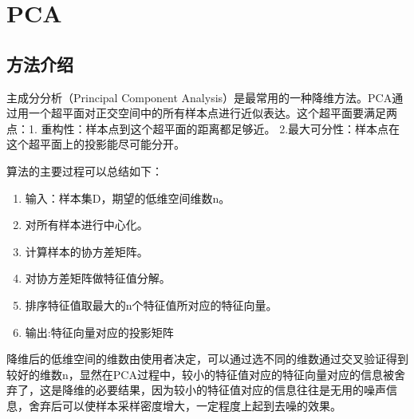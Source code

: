\documentclass[UTF8]{ctexart}
\begin{document}

\newpage
\section{PCA}
\subsection{方法介绍}
主成分分析（Principal Component Analysis）是最常用的一种降维方法。PCA通过用一个超平面对正交空间中的所有样本点进行近似表达。这个超平面要满足两点：1. 重构性：样本点到这个超平面的距离都足够近。 2.最大可分性：样本点在这个超平面上的投影能尽可能分开。\vspace{3mm}  


算法的主要过程可以总结如下：



\begin{enumerate}
	\item 输入：样本集D，期望的低维空间维数n。
	\item 对所有样本进行中心化。
	\item 计算样本的协方差矩阵。
	\item 对协方差矩阵做特征值分解。
	\item 排序特征值取最大的n个特征值所对应的特征向量。
	\item 输出:特征向量对应的投影矩阵
\end{enumerate}



降维后的低维空间的维数由使用者决定，可以通过选不同的维数通过交叉验证得到较好的维数n，显然在PCA过程中，较小的特征值对应的特征向量对应的信息被舍弃了，这是降维的必要结果，因为较小的特征值对应的信息往往是无用的噪声信息，舍弃后可以使样本采样密度增大，一定程度上起到去噪的效果。
\end{document}
